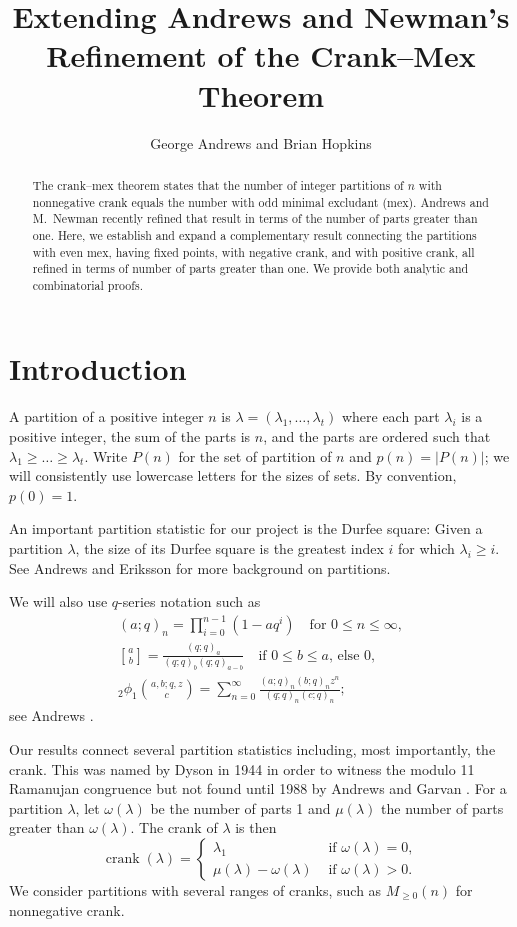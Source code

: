 \documentclass{amsart}
\title[Extending a Refinement of the Crank--Mex Theorem]{Extending Andrews and Newman's Refinement of the Crank--Mex Theorem}
\author{George Andrews and Brian Hopkins}
\date{}
\theoremstyle{theorem}
\theoremstyle{definition}
\DeclareMathOperator{\ck}{crank}
\begin{document}
\begin{abstract}
The crank--mex theorem states that the number of integer partitions of $n$ with nonnegative crank equals the number with odd minimal excludant (mex).  Andrews and M.\ Newman recently refined that result in terms of the number of parts greater than one.  Here, we establish and expand a complementary result connecting the partitions with even mex, having fixed points, with negative crank, and with positive crank, all refined in terms of number of parts greater than one.  We provide both analytic and combinatorial proofs.
\end{abstract}


\maketitle


\section{Introduction}

A partition of a positive integer $n$ is $\lambda = (\lambda_1, \ldots, \lambda_t)$ where each part $\lambda_i$ is a positive integer, the sum of the parts is $n$, and the parts are ordered such that $\lambda_1 \ge \ldots \ge \lambda_t$.  Write $P(n)$ for the set of partition of $n$ and $p(n) = |P(n)|$; we will consistently use lowercase letters for the sizes of sets.  By convention, $p(0) = 1$.

An important partition statistic for our project is the Durfee square: Given a partition $\lambda$, the size of its Durfee square is the greatest index $i$ for which $\lambda_i \ge i$.  See Andrews and Eriksson \cite{ae} for more background on partitions.

We will also use $q$-series notation such as 
\begin{gather*}
(a;q)_n = \prod_{i = 0}^{n-1} (1-aq^i) \quad \text{for $0 \le n \le \infty$},\\
{a \brack b} = \frac{(q;q)_a}{(q;q)_b (q;q)_{a-b}} \quad \text{if $0 \le b \le a$, else $0$}, \\
{}_2\phi_1\binom{a, b; q, z}{c} = \sum_{n = 0}^\infty \frac{(a;q)_n (b;q)_n z^n}{(q;q)_n (c;q)_n};
\end{gather*}
see Andrews \cite{a}.

Our results connect several partition statistics including, most importantly, the crank.  This was named by Dyson in 1944 in order to witness the modulo 11 Ramanujan congruence but not found until 1988 by Andrews and Garvan \cite{ag}.  For a partition $\lambda$, let 
$\omega(\lambda)$ be the number of parts 1 and $\mu(\lambda)$ the number of parts greater than $\omega(\lambda)$. The crank of $\lambda$ is then
\[ \ck(\lambda) =\begin{cases} \lambda_1 & \text{ if $\omega(\lambda)=0$},\\
\mu(\lambda) - \omega(\lambda) & \text{ if $\omega(\lambda)>0$}.
\end{cases} \]
We consider partitions with several ranges of cranks, such as $M_{\ge 0}(n)$ for nonnegative crank.
\end{document}
